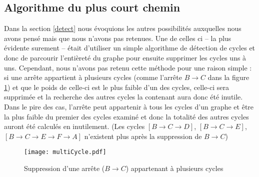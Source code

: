 \documentclass[12pt, oneside]{article}
\begin{document}
\subsection{Algorithme du plus court chemin}
\label{others}
Dans la section \ref{detect} nous évoquions les autres possibilités auxquelles nous avons pensé mais que nous n'avons pas retenues.
Une de celles ci -- la plus évidente surement -- était d'utiliser un simple algorithme de détection de cycles et donc de parcourir l'entièreté du graphe pour ensuite supprimer les cycles uns à uns.
Cependant, nous n'avons pas retenu cette méthode pour une raison simple : si une arrête appartient à plusieurs cycles (comme l'arrête $B \rightarrow C$ dans la figure \ref{multiCycle}) et que le poids de celle-ci est le plus faible d'un des cycles, celle-ci sera supprimée et la recherche des autres cycles la contenant aura donc été inutile. Dans le pire des cas, l'arrête peut appartenir à tous les cycles d'un graphe et être la plus faible du premier des cycles examiné et donc la totalité des autres cycles auront été calculés en inutilement. (Les cycles $[B \rightarrow C \rightarrow D]$, $[B \rightarrow C \rightarrow E]$, $[B \rightarrow C \rightarrow E \rightarrow F \rightarrow A]$ n'existent plus après la suppression de $B \rightarrow C$)
\begin{figure}[h]
\caption{\label{multiCycle} Suppression d'une arrête ($B \rightarrow C$) appartenant à plusieurs cycles}
\center
\texttt{[image: multiCycle.pdf]}
\end{figure}
\end{document}
